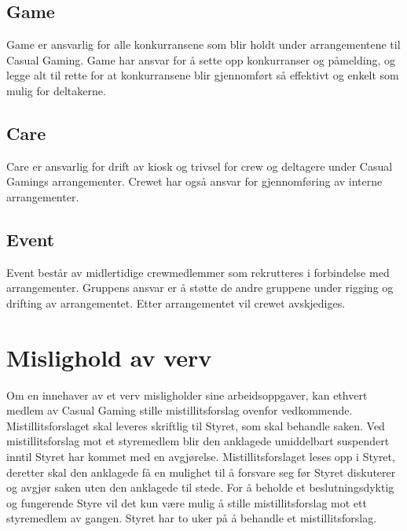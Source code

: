 \subsection{Game}
Game er ansvarlig for alle konkurransene som blir holdt under arrangementene til Casual Gaming. Game har ansvar for å sette opp konkurranser og påmelding, og legge alt til rette for at konkurransene blir gjennomført så effektivt og enkelt som mulig for deltakerne.

\subsection{Care}
Care er ansvarlig for drift av kiosk og trivsel for crew og deltagere under Casual Gamings arrangementer. Crewet har også ansvar for gjennomføring av interne arrangementer.

\subsection{Event}
Event består av midlertidige crewmedlemmer som rekrutteres i forbindelse med arrangementer. Gruppens ansvar er å støtte de andre gruppene under rigging og drifting av arrangementet. Etter arrangementet vil crewet avskjediges.

\section{Mislighold av verv}
Om en innehaver av et verv misligholder sine arbeidsoppgaver, kan ethvert medlem av Casual Gaming stille mistillitsforslag ovenfor vedkommende. Mistillitsforslaget skal leveres skriftlig til Styret, som skal behandle saken. Ved mistillitsforslag mot et styremedlem blir den anklagede umiddelbart suspendert inntil Styret har kommet med en avgjørelse. Mistillitsforslaget leses opp i Styret, deretter skal den anklagede få en mulighet til å forsvare seg før Styret diskuterer og avgjør saken uten den anklagede til stede. For å beholde et beslutningsdyktig og fungerende Styre vil det kun være mulig å stille mistillitsforslag mot ett styremedlem av gangen. Styret har to uker på å behandle et mistillitsforslag.
